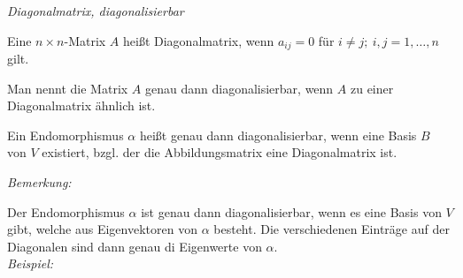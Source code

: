 \begin{mydef} \textit{Diagonalmatrix, diagonalisierbar}

    Eine $n\times n$-Matrix $A$ heißt Diagonalmatrix, wenn $a_{ij}=0$ für $i\neq j; \ i,j=1,\ldots,n$ gilt.

    Man nennt die Matrix $A$ genau dann diagonalisierbar, wenn $A$ zu einer Diagonalmatrix ähnlich ist.

    Ein Endomorphismus $\alpha$ heißt genau dann diagonalisierbar, wenn eine Basis $B$ von $V$ existiert, bzgl. der die Abbildungsmatrix eine Diagonalmatrix ist.
\end{mydef}

\textit{Bemerkung:}

Der Endomorphismus $\alpha$ ist genau dann diagonalisierbar, wenn es eine Basis von $V$ gibt, welche aus Eigenvektoren von $\alpha$ besteht. Die verschiedenen Einträge auf der Diagonalen sind dann genau di Eigenwerte von $\alpha$.\\

\textit{Beispiel:}

